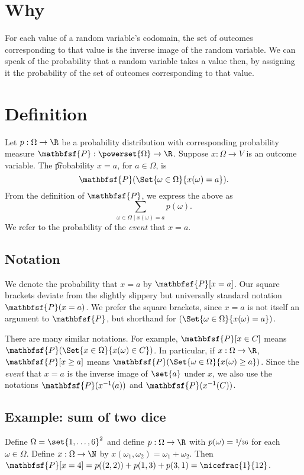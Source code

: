 
\section*{Why}

For each value of a random variable's codomain, the set of outcomes corresponding to that value is the inverse image of the random variable.
We can speak of the probability that a random variable takes a value then, by assigning it the probability of the set of outcomes corresponding to that value.

\section*{Definition}

Let $p: \Omega  \to \R $ be a probability distribution with corresponding probability measure $\mathbfsf{P} : \powerset{\Omega } \to \R $.
Suppose $x: \Omega  \to V$ is an outcome variable.
The \t{probability $x = a$}, for $a \in \Omega $, is
  \[
\textstyle
\mathbfsf{P} (\Set{\omega  \in \Omega }{x(\omega ) = a}).
  \]
From the definition of $\mathbfsf{P} $, we express the above as
  \[
\textstyle
\sum_{\omega  \in \Omega  \mid  x(\omega ) = a} p(\omega ).
  \]
We refer to the probability of the \textit{event} that $x = a$.

\subsection*{Notation}

We denote the probability that $x = a$ by $\mathbfsf{P} [x =a]$.
Our square brackets deviate from the slightly slippery but universally standard notation $\mathbfsf{P} (x = a)$.
We prefer the square brackets, since $x=a$ is not itself an argument to $\mathbfsf{P} $, but shorthand for $(\Set{\omega  \in \Omega }{x(\omega ) = a})$.

There are many similar notations.
For example, $\mathbfsf{P} [x \in C]$ means $\mathbfsf{P} (\Set{x \in \Omega }{x(\omega ) \in C})$.
In particular, if $x: \Omega  \to \R $, $\mathbfsf{P} [x \geq a]$ means $\mathbfsf{P} (\Set{\omega  \in \Omega }{x(\omega ) \geq a})$.
Since the \textit{event} that $x = a$ is the inverse image of $\set{a}$ under $x$, we also use the notations $\mathbfsf{P} (x^{-1}(a))$ and $\mathbfsf{P} (x^{-1}(C))$.

\subsection*{Example: sum of two dice}

Define $\Omega  = \set{1, \dots , 6}^2$ and define $p: \Omega \to \R $ with $p(\omega ) = \nicefrac{1}{36}$ for each $\omega \in \Omega $.
Define $x: \Omega  \to \N $ by $x(\omega _1, \omega _2) = \omega _1 + \omega _2$.
Then $\mathbfsf{P} [x = 4] = p((2, 2)) + p(1, 3) + p(3, 1) = \nicefrac{1}{12}$.
